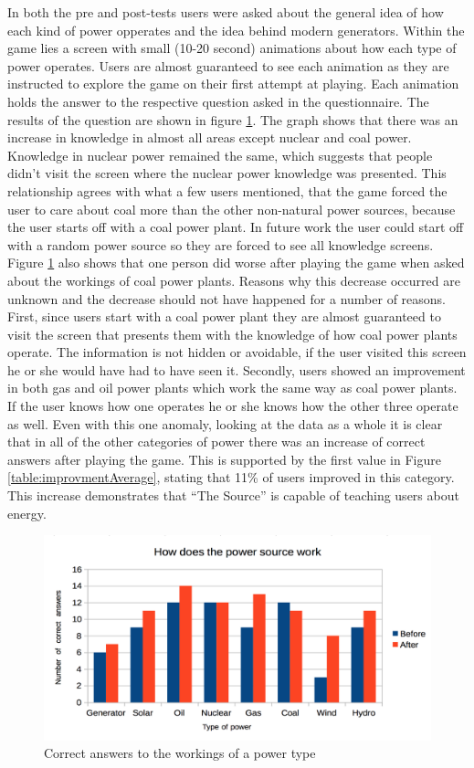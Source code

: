 \documentclass[msc,oneside]{ubcthesis}%
\begin{document}
    In both the pre and post-tests users were asked about the general idea of how each kind of power opperates and the idea behind modern generators. Within the game lies a screen with small (10-20 second) animations about how each type of power operates. Users are almost guaranteed to see each animation as they are instructed to explore the game on their first attempt at playing. Each animation holds the answer to the respective question asked in the questionnaire. The results of the question are shown in figure \ref{workings}. The graph shows that there was an increase in knowledge in almost all areas except nuclear and coal power. Knowledge in nuclear power remained the same, which suggests that people didn't visit the screen where the nuclear power knowledge was presented. This relationship agrees with what a few users mentioned, that the game forced the user to care about coal more than the other non-natural power sources, because the user starts off with a coal power plant. In future work the user could start off with a random power source so they are forced to see all knowledge screens. Figure \ref{workings} also shows that one person did worse after playing the game when asked about the workings of coal power plants. Reasons why this decrease occurred are unknown and the decrease should not have happened for a number of reasons. First, since users start with a coal power plant they are almost guaranteed to visit the screen that presents them with the knowledge of how coal power plants operate. The information is not hidden or avoidable, if the user visited this screen he or she would have had to have seen it. Secondly, users showed an improvement in both gas and oil power plants which work the same way as coal power plants. If the user knows how one operates he or she knows how the other three operate as well. 
    Even with this one anomaly, looking at the data as a whole it is clear that in all of the other categories of power there was an increase of correct answers after playing the game. This is supported by the first value in Figure \ref{table:improvmentAverage}, stating that 11\% of users improved in this category. This increase demonstrates that ``The Source'' is capable of teaching users about energy. 
    \begin{figure}[hbt]
  \begin{center}
    \includegraphics[width=1\textwidth]{survey_pics/post_and_pre/workings}
    \caption[The workings of Power plants ]{Correct answers to the workings of a power type}\label{workings}
  \end{center}
\end{figure}
\end{document}
